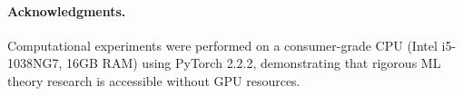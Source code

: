 \documentclass[11pt]{article}
\theoremstyle{definition}
\theoremstyle{remark}
\begin{document}
\paragraph{Acknowledgments.}
Computational experiments were performed on a consumer-grade CPU (Intel i5-1038NG7, 16GB RAM) using PyTorch 2.2.2, demonstrating that rigorous ML theory research is accessible without GPU resources.




\newpage
\appendix

\end{document}
